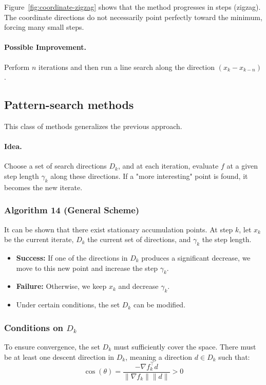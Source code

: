 \begin{figureexplanation}
Figure~\ref{fig:coordinate-zigzag} shows that the method progresses in steps (zigzag). The coordinate directions do not necessarily point perfectly toward the minimum, forcing many small steps.
\end{figureexplanation}

\paragraph{Possible Improvement.}
Perform $n$ iterations and then run a line search along the direction $(x_k - x_{k-n})$.
\subsection{Pattern-search methods}

This class of methods generalizes the previous approach.

\paragraph{Idea.}
Choose a set of search directions $D_k$, and at each iteration, evaluate $f$ at a given step length $\gamma_k$ along these directions.
If a "more interesting" point is found, it becomes the new iterate.

\subsubsection{Algorithm 14 (General Scheme)}
It can be shown that there exist stationary accumulation points.
At step $k$, let $x_k$ be the current iterate, $D_k$ the current set of directions, and $\gamma_k$ the step length.

\begin{itemize}
    \item \textbf{Success:} If one of the directions in $D_k$ produces a significant decrease, we move to this new point and increase the step $\gamma_k$.
    \item \textbf{Failure:} Otherwise, we keep $x_k$ and decrease $\gamma_k$.
    \item Under certain conditions, the set $D_k$ can be modified.
\end{itemize}

\subsubsection{Conditions on $D_k$}
To ensure convergence, the set $D_k$ must sufficiently cover the space.
There must be at least one descent direction in $D_k$, meaning a direction $d \in D_k$ such that:
\[
    \cos(\theta) = \frac{-\nabla f_k^\top d}{\|\nabla f_k\| \|d\|} > 0
\]

